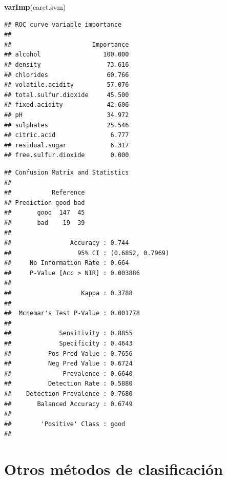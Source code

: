 \documentclass[
  spanish,
]{book}
\newenvironment{Shaded}{\begin{snugshade}}{\end{snugshade}}
\newcommand{\DataTypeTok}[1]{\textcolor[rgb]{0.13,0.29,0.53}{#1}}
\newcommand{\KeywordTok}[1]{\textcolor[rgb]{0.13,0.29,0.53}{\textbf{#1}}}
\newcommand{\NormalTok}[1]{#1}
\newcommand{\OperatorTok}[1]{\textcolor[rgb]{0.81,0.36,0.00}{\textbf{#1}}}
\theoremstyle{break}
\theoremstyle{definition}
\theoremstyle{definition}
\theoremstyle{definition}
\theoremstyle{remark}
\begin{document}
\begin{Shaded}
\begin{Highlighting}[]
\KeywordTok{varImp}\NormalTok{(caret.svm)}
\end{Highlighting}
\end{Shaded}

\begin{verbatim}
## ROC curve variable importance
## 
##                      Importance
## alcohol                 100.000
## density                  73.616
## chlorides                60.766
## volatile.acidity         57.076
## total.sulfur.dioxide     45.500
## fixed.acidity            42.606
## pH                       34.972
## sulphates                25.546
## citric.acid               6.777
## residual.sugar            6.317
## free.sulfur.dioxide       0.000
\end{verbatim}

\begin{Shaded}
\end{Shaded}

\begin{verbatim}
## Confusion Matrix and Statistics
## 
##           Reference
## Prediction good bad
##       good  147  45
##       bad    19  39
##                                           
##                Accuracy : 0.744           
##                  95% CI : (0.6852, 0.7969)
##     No Information Rate : 0.664           
##     P-Value [Acc > NIR] : 0.003886        
##                                           
##                   Kappa : 0.3788          
##                                           
##  Mcnemar's Test P-Value : 0.001778        
##                                           
##             Sensitivity : 0.8855          
##             Specificity : 0.4643          
##          Pos Pred Value : 0.7656          
##          Neg Pred Value : 0.6724          
##              Prevalence : 0.6640          
##          Detection Rate : 0.5880          
##    Detection Prevalence : 0.7680          
##       Balanced Accuracy : 0.6749          
##                                           
##        'Positive' Class : good            
## 
\end{verbatim}

\hypertarget{class-otros}{%
\chapter{Otros métodos de clasificación}\label{class-otros}}
\end{document}
